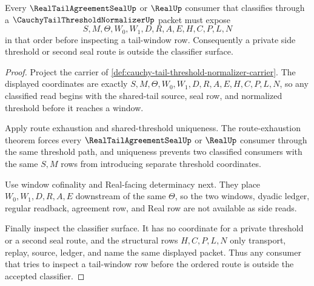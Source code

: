 \begin{theorem}
\label{thm:cauchy-tail-threshold-normalizer-window-scope}
Every $\RealTailAgreementSealUp$ or $\RealUp$ consumer that classifies through a $\CauchyTailThresholdNormalizerUp$ packet must expose
$$
S,M,\Theta,W_0,W_1,D,R,A,E,H,C,P,L,N
$$
in that order before inspecting a tail-window row. Consequently a private side threshold or second seal route is outside the classifier surface.
\end{theorem}
\begin{proof}
Project the carrier of \autoref{def:cauchy-tail-threshold-normalizer-carrier}. The displayed coordinates are exactly $S,M,\Theta,W_0,W_1,D,R,A,E,H,C,P,L,N$, so any classified read begins with the shared-tail source, seal row, and normalized threshold before it reaches a window.

Apply route exhaustion and shared-threshold uniqueness. The route-exhaustion theorem forces every $\RealTailAgreementSealUp$ or $\RealUp$ consumer through the same threshold path, and uniqueness prevents two classified consumers with the same $S,M$ rows from introducing separate threshold coordinates.

Use window cofinality and Real-facing determinacy next. They place $W_0,W_1,D,R,A,E$ downstream of the same $\Theta$, so the two windows, dyadic ledger, regular readback, agreement row, and Real row are not available as side reads.

Finally inspect the classifier surface. It has no coordinate for a private threshold or a second seal route, and the structural rows $H,C,P,L,N$ only transport, replay, source, ledger, and name the same displayed packet. Thus any consumer that tries to inspect a tail-window row before the ordered route is outside the accepted classifier.
\end{proof}

